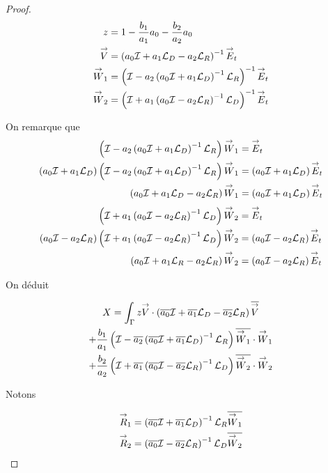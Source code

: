 \begin{proof}
    \begin{align*}
      z &= 1-\frac{b_1}{a_1}a_0 -\frac{b_2}{a_2}a_0
      \\
      \vV & = \left(a_0\oI  + a_1 \LD - a_2\LR \right)^{-1} \vE_t
      \\
      \vW_1 & = \left( \oI - a_2 \left( a_0\oI + a_1\LD\right)^{-1}\LR\right)^{-1} \vE_t
      \\
      \vW_2 & = \left( \oI + a_1 \left( a_0\oI - a_2\LR\right)^{-1}\LD\right)^{-1} \vE_t
    \end{align*}

    On remarque que
    \begin{align*}
      \left( \oI - a_2 \left( a_0\oI + a_1\LD\right)^{-1}\LR\right)\vW_1 &= \vE_t
      \\
      \left( a_0\oI + a_1 \LD \right)\left( \oI - a_2 \left( a_0\oI + a_1\LD\right)^{-1}\LR\right)\vW_1&= \left( a_0\oI + a_1 \LD \right)\vE_t
      \\
      \left( a_0\oI + a_1 \LD - a_2 \LR\right)\vW_1 &= \left( a_0\oI + a_1 \LD \right)\vE_t
    \end{align*}
    \begin{align*}
      \left( \oI + a_1 \left( a_0\oI - a_2\LR\right)^{-1}\LD\right)\vW_2 &= \vE_t
      \\
      \left( a_0\oI - a_2 \LR \right)\left( \oI + a_1 \left( a_0\oI - a_2\LR\right)^{-1}\LD\right)\vW_2&= \left( a_0\oI - a_2 \LR \right)\vE_t
      \\
      \left( a_0\oI + a_1 \LR - a_2 \LR\right)\vW_2 &= \left( a_0\oI - a_2 \LR \right)\vE_t
    \end{align*}

    On déduit

    \begin{multline*}
      X = \int_\Gamma z \vV \cdot \left(\conj{a_0}\oI  + \conj{a_1} \LD - \conj{a_2}\LR\right)\conj{\vV}
      \\
      + \frac{b_1}{a_1} \left( \oI - \conj{a_2} \left( \conj{a_0}\oI + \conj{a_1}\LD\right)^{-1}\LR\right)\conj{\vW_1}\cdot\vW_1
      \\
      + \frac{b_2}{a_2} \left( \oI + \conj{a_1} \left( \conj{a_0}\oI - \conj{a_2}\LR\right)^{-1}\LD\right)\conj{\vW_2}\cdot\vW_2
    \end{multline*}

    Notons

    \newcommand{\vR}{\vect{R}}

    \begin{align*}
      \vR_1 & = \left(\conj{a_0}\oI  + \conj{a_1} \LD \right)^{-1}\LR \conj{\vW_1}
      \\
      \vR_2 & = \left(\conj{a_0}\oI  - \conj{a_2} \LR \right)^{-1}\LD \conj{\vW_2}
    \end{align*}


\end{proof}

